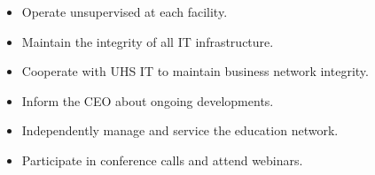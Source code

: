 \duties
\begin{itemize}[leftmargin=*]
\item Operate unsupervised at each facility.
\item Maintain the integrity of all IT infrastructure.
\item Cooperate with UHS IT to maintain business network integrity.%
\item Inform the CEO about ongoing developments.
\item Independently manage and service the education network.
\item Participate in conference calls and attend webinars.\hfill%
\end{itemize}%